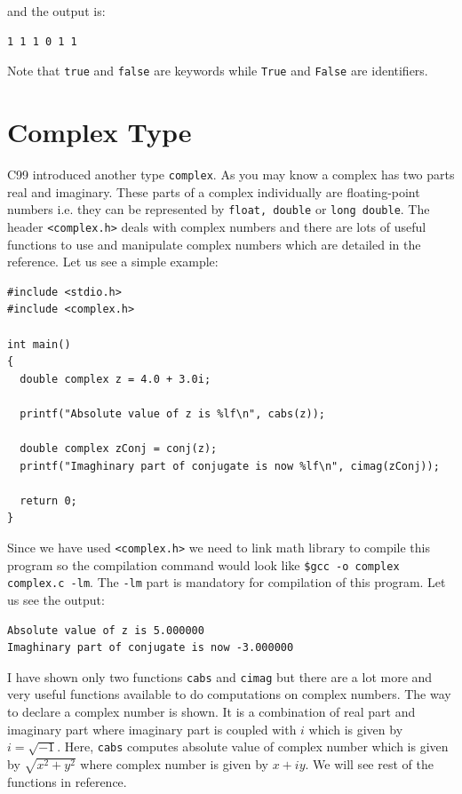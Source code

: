 and the output is:

\begin{Verbatim}[frame=single]
1 1 1 0 1 1
\end{Verbatim}

Note that \texttt{true} and \texttt{false} are keywords while \texttt{True} and
\texttt{False} are identifiers.

\section{Complex Type}
C99 introduced another type \texttt{complex}. As you may know a complex has two
parts real and imaginary. These parts of a complex individually are
floating-point numbers i.e. they can be represented by \texttt{float, double}
or \texttt{long double}. The header \texttt{<complex.h>} deals with complex
numbers and there are lots of useful functions to use and manipulate complex
numbers which are detailed in the reference. Let us see a simple example:

\begin{Verbatim}[frame=single]
#include <stdio.h>
#include <complex.h>

int main()
{
  double complex z = 4.0 + 3.0i;

  printf("Absolute value of z is %lf\n", cabs(z));

  double complex zConj = conj(z);
  printf("Imaghinary part of conjugate is now %lf\n", cimag(zConj));

  return 0;
}
\end{Verbatim}

Since we have used \texttt{<complex.h>} we need to link math library to compile
this program so the compilation command would look like \texttt{\$gcc -o complex
complex.c -lm}. The \texttt{-lm} part is mandatory for compilation of this
program. Let us see the output:

\begin{Verbatim}[frame=single]
Absolute value of z is 5.000000
Imaghinary part of conjugate is now -3.000000
\end{Verbatim}

I have shown only two functions \texttt{cabs} and \texttt{cimag} but there are
a lot more and very useful functions available to do computations on complex
numbers. The way to declare a complex number is shown. It is a combination of
real part and imaginary part where imaginary part is coupled with $i$ which is
given by $i = \sqrt{-1}$. Here, \texttt{cabs} computes absolute value of
complex number which is given by $\sqrt{x^2 + y^2}$ where complex number is
given by $x + iy$. We will see rest of the functions in reference.

